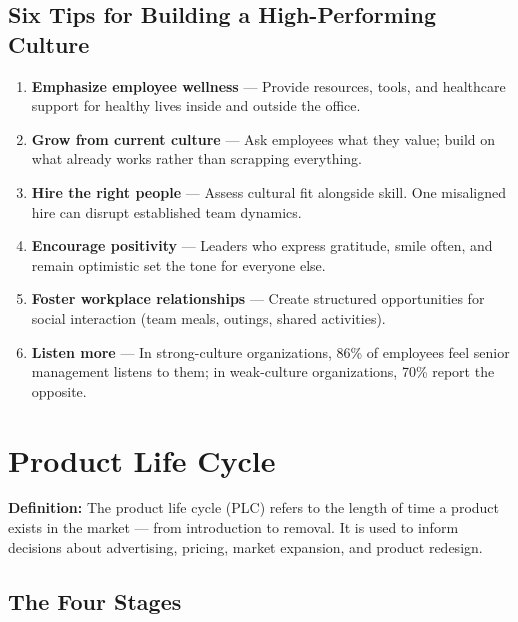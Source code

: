 \documentclass[11pt, letterpaper]{article}
\begin{document}
\subsection{Six Tips for Building a High-Performing Culture}

\begin{enumerate}[leftmargin=*, label=\textbf{\arabic*.}]
  \item \textbf{Emphasize employee wellness} --- Provide resources, tools, and healthcare support for healthy lives inside and outside the office.
  \item \textbf{Grow from current culture} --- Ask employees what they value; build on what already works rather than scrapping everything.
  \item \textbf{Hire the right people} --- Assess cultural fit alongside skill. One misaligned hire can disrupt established team dynamics.
  \item \textbf{Encourage positivity} --- Leaders who express gratitude, smile often, and remain optimistic set the tone for everyone else.
  \item \textbf{Foster workplace relationships} --- Create structured opportunities for social interaction (team meals, outings, shared activities).
  \item \textbf{Listen more} --- In strong-culture organizations, 86\% of employees feel senior management listens to them; in weak-culture organizations, 70\% report the opposite.
\end{enumerate}

\newpage

\section{Product Life Cycle}

\begin{defbox}
\textbf{Definition:} The product life cycle (PLC) refers to the length of time a product exists in the market --- from introduction to removal. It is used to inform decisions about advertising, pricing, market expansion, and product redesign.
\end{defbox}

\subsection{The Four Stages}
\end{document}
